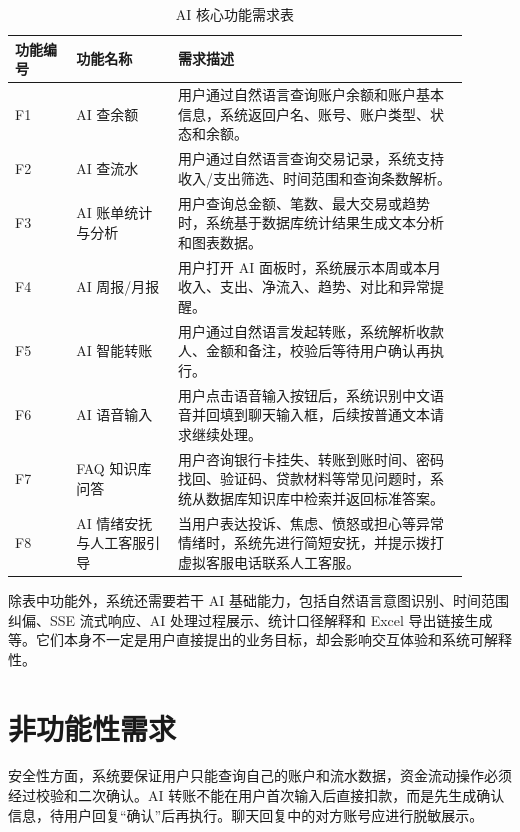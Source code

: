 \documentclass[bachelor, print]{xduthesis}
\begin{document}
\begin{table}[H]
    \centering
    \caption{AI 核心功能需求表}
    \label{tab:ai-requirements}
    \begin{tabular}{|p{0.12\linewidth}|p{0.2\linewidth}|p{0.58\linewidth}|}
        \hline
        功能编号 & 功能名称 & 需求描述 \\
        \hline
        F1 & AI 查余额 & 用户通过自然语言查询账户余额和账户基本信息，系统返回户名、账号、账户类型、状态和余额。 \\
        \hline
        F2 & AI 查流水 & 用户通过自然语言查询交易记录，系统支持收入/支出筛选、时间范围和查询条数解析。 \\
        \hline
        F3 & AI 账单统计与分析 & 用户查询总金额、笔数、最大交易或趋势时，系统基于数据库统计结果生成文本分析和图表数据。 \\
        \hline
        F4 & AI 周报/月报 & 用户打开 AI 面板时，系统展示本周或本月收入、支出、净流入、趋势、对比和异常提醒。 \\
        \hline
        F5 & AI 智能转账 & 用户通过自然语言发起转账，系统解析收款人、金额和备注，校验后等待用户确认再执行。 \\
        \hline
        F6 & AI 语音输入 & 用户点击语音输入按钮后，系统识别中文语音并回填到聊天输入框，后续按普通文本请求继续处理。 \\
        \hline
        F7 & FAQ 知识库问答 & 用户咨询银行卡挂失、转账到账时间、密码找回、验证码、贷款材料等常见问题时，系统从数据库知识库中检索并返回标准答案。 \\
        \hline
        F8 & AI 情绪安抚与人工客服引导 & 当用户表达投诉、焦虑、愤怒或担心等异常情绪时，系统先进行简短安抚，并提示拨打虚拟客服电话联系人工客服。 \\
        \hline
    \end{tabular}
\end{table}

除表中功能外，系统还需要若干 AI 基础能力，包括自然语言意图识别、时间范围纠偏、SSE 流式响应、AI 处理过程展示、统计口径解释和 Excel 导出链接生成等。它们本身不一定是用户直接提出的业务目标，却会影响交互体验和系统可解释性。

\section{非功能性需求}

安全性方面，系统要保证用户只能查询自己的账户和流水数据，资金流动操作必须经过校验和二次确认。AI 转账不能在用户首次输入后直接扣款，而是先生成确认信息，待用户回复“确认”后再执行。聊天回复中的对方账号应进行脱敏展示。
\end{document}
